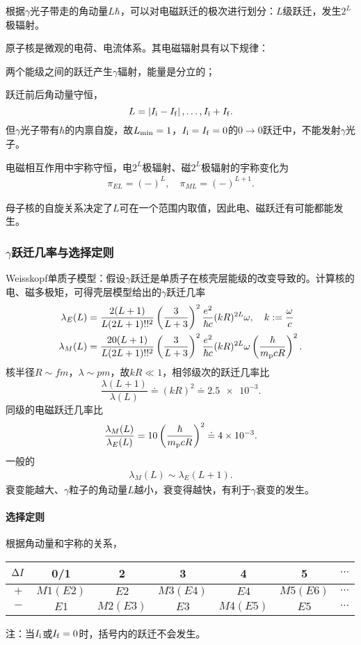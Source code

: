 根据$\gamma$光子带走的角动量$L\hbar$，可以对电磁跃迁的极次进行划分：$L$级跃迁，发生$2^L$极辐射。

原子核是微观的电荷、电流体系。其电磁辐射具有以下规律：
\begin{compactenum}
	\item 两个能级之间的跃迁产生$\gamma$辐射，能量是分立的；
	\item 跃迁前后角动量守恒，
	\[
		L=\left\lvert I_{\mathrm{i}}-I_{\mathrm{f}}\right\rvert,\ldots,I_{\mathrm{i}}+I_{\mathrm{f}}.
	\]
	但$\gamma$光子带有$\hbar$的内禀自旋，故$L_\mathrm{min}=1$，$I_{\mathrm{i}}=I_{\mathrm{f}}=0$的$0\to0$跃迁中，不能发射$\gamma$光子。
	\item 电磁相互作用中宇称守恒，电$2^L$极辐射、磁$2^L$极辐射的宇称变化为
	\begin{align}
		\pi_{EL}=(-)^L,\quad\pi_{ML}=(-)^{L+1}.
	\end{align}
\end{compactenum}
母子核的自旋关系决定了$L$可在一个范围内取值，因此电、磁跃迁有可能都能发生。
\subsubsection[\textit{\textgamma}跃迁几率与选择定则]{$\gamma$跃迁几率与选择定则}
Weisskopf单质子模型：假设$\gamma$跃迁是单质子在核壳层能级的改变导致的。计算核的电、磁多极矩，可得壳层模型给出的$\gamma$跃迁几率
\begin{align*}
	\lambda_E(L)&=\frac{2(L+1)}{L(2L+1)!!^2}\left(\frac{3}{L+3}\right)^2\frac{e^2}{\hbar c}(kR)^{2L}\omega,\quad k:=\frac\omega{c}\\
	\lambda_M(L)&=\frac{20(L+1)}{L(2L+1)!!^2}\left(\frac{3}{L+3}\right)^2\frac{e^2}{\hbar c}(kR)^{2L}\omega\left(\frac\hbar{m_\mathrm p cR}\right)^2.
\end{align*}
核半径$R\sim\si{fm}$，$\lambda\sim\si{pm}$，故$kR\ll 1$，相邻级次的跃迁几率比
\[
	\frac{\lambda(L+1)}{\lambda(L)}\doteq(kR)^2\doteq\num{2.5e-3}.
\]
同级的电磁跃迁几率比
\[
	\frac{\lambda_M(L)}{\lambda_E(L)}=10\left(\frac\hbar{m_\mathrm p cR}\right)^2\doteq\num{4e-3}.
\]
一般的
\begin{align}
	\lambda_M(L)\sim\lambda_E(L+1).
\end{align}
衰变能越大、$\gamma$粒子的角动量$L$越小，衰变得越快，有利于$\gamma$衰变的发生。%

\paragraph{选择定则}根据角动量和宇称的关系，
\begin{center}
	\begin{tabular}{ccccccc}
		\toprule
		$\Delta I$&0/1&2&3&4&5&$\cdots$\\
		\midrule
		$+$&$M1(E2)$&$E2$&$M3(E4)$&$E4$&$M5(E6)$&$\cdots$\\
		$-$&$E1$&$M2(E3)$&$E3$&$M4(E5)$&$E5$&$\cdots$\\
		\bottomrule
	\end{tabular}
\end{center}
注：当$I_{\mathrm{i}}$或$I_{\mathrm{f}}=0$时，括号内的跃迁不会发生。
